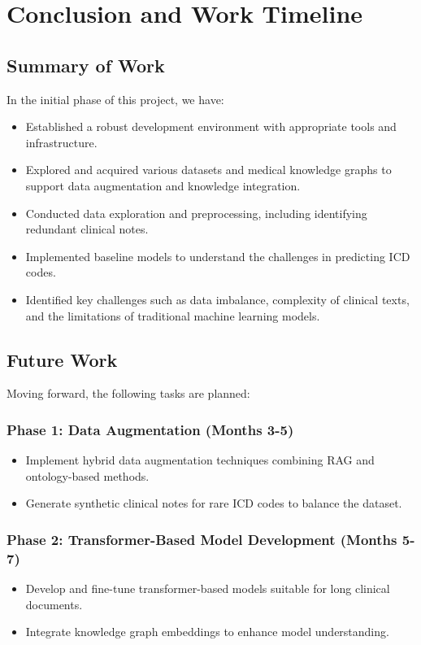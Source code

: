 \documentclass[12pt,a4paper]{report}
\begin{document}
\chapter{Conclusion and Work Timeline}

\section{Summary of Work}
In the initial phase of this project, we have:
\begin{itemize}
    \item Established a robust development environment with appropriate tools and infrastructure.
    \item Explored and acquired various datasets and medical knowledge graphs to support data augmentation and knowledge integration.
    \item Conducted data exploration and preprocessing, including identifying redundant clinical notes.
    \item Implemented baseline models to understand the challenges in predicting ICD codes.
    \item Identified key challenges such as data imbalance, complexity of clinical texts, and the limitations of traditional machine learning models.
\end{itemize}

\section{Future Work}
Moving forward, the following tasks are planned:

\subsection{Phase 1: Data Augmentation (Months 3-5)}
\begin{itemize}
    \item Implement hybrid data augmentation techniques combining RAG and ontology-based methods.
    \item Generate synthetic clinical notes for rare ICD codes to balance the dataset.
\end{itemize}

\subsection{Phase 2: Transformer-Based Model Development (Months 5-7)}
\begin{itemize}
    \item Develop and fine-tune transformer-based models suitable for long clinical documents.
    \item Integrate knowledge graph embeddings to enhance model understanding.
\end{itemize}
\end{document}
